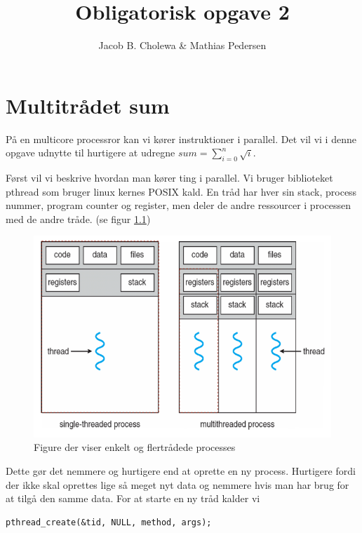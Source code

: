 \documentclass[danish]{report}
\title{Obligatorisk opgave 2}
\author{Jacob B. Cholewa \& Mathias Pedersen }
\begin{document}
\maketitle
\chapter{Multitrådet sum}
På en multicore processror kan vi kører instruktioner i parallel. Det vil vi i denne opgave udnytte til hurtigere at udregne $ sum = \displaystyle\sum\limits_{i=0}^n \sqrt{i} $.

Først vil vi beskrive hvordan man kører ting i parallel. Vi bruger biblioteket pthread som bruger linux kernes POSIX kald. En tråd har hver sin stack, process nummer, program counter og register, men deler de andre ressourcer i processen med de andre tråde. (se figur \ref{fig:1})


\begin{figure}[H]
\begin{center}
\includegraphics[scale=0.4]{img/1.png}
\caption{Figure der viser enkelt og flertrådede processes}
\label{fig:1}
\end{center}
\end{figure}


Dette gør det nemmere og hurtigere end at oprette en ny process. Hurtigere fordi der ikke skal oprettes lige så meget nyt data og nemmere hvis man har brug for at tilgå den samme data. For at starte en ny tråd kalder vi



\begin{lstlisting}
pthread_create(&tid, NULL, method, args);
\end{lstlisting}
\end{document}
